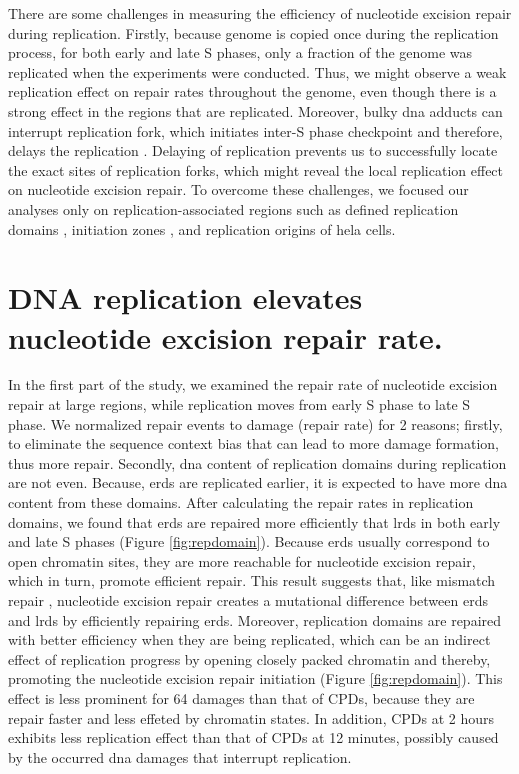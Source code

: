 There are some challenges in measuring the efficiency of nucleotide excision repair during replication. Firstly, because genome is copied once during the replication process, for both early and late S phases, only a fraction of the genome was replicated when the experiments were conducted. Thus, we might observe a weak replication effect on repair rates throughout the genome, even though there is a strong effect in the regions that are replicated. Moreover, bulky \gls{dna} adducts can interrupt replication fork, which initiates inter-S phase checkpoint and therefore, delays the replication \citep{minca2011replication}. Delaying of replication prevents us to successfully locate the exact sites of replication forks, which might reveal the local replication effect on nucleotide excision repair. To overcome these challenges, we focused our analyses only on replication-associated regions such as defined replication domains \citep{liu2016novo}, initiation zones \citep{petryk2016replication}, and replication origins \citep{besnard2012unraveling} of \gls{hela} cells.     

\section{DNA replication elevates nucleotide excision repair rate.}

In the first part of the study, we examined the repair rate of nucleotide excision repair at large regions, while replication moves from early S phase to late S phase. We normalized repair events to damage (repair rate) for 2 reasons; firstly, to eliminate the sequence context bias that can lead to more damage formation, thus more repair. Secondly, \gls{dna} content of replication domains during replication are not even. Because, \gls{erd}s are replicated earlier, it is expected to have more \gls{dna} content from these domains. After calculating the repair rates in replication domains, we found that \gls{erd}s are repaired more efficiently that \gls{lrd}s in both early and late S phases (Figure \ref{fig:repdomain}). Because \gls{erd}s usually correspond to open chromatin sites, they are more reachable for nucleotide excision repair, which in turn, promote efficient repair. This result suggests that, like mismatch repair \citep{supek2015differential}, nucleotide excision repair creates a mutational difference between \gls{erd}s and \gls{lrd}s by efficiently repairing \gls{erd}s. Moreover, replication domains are repaired with better efficiency when they are being replicated, which can be an indirect effect of replication progress by opening closely packed chromatin and thereby, promoting the nucleotide excision repair initiation (Figure \ref{fig:repdomain}). This effect is less prominent for \gls{64} damages than that of \gls{CPD}s, because they are repair faster and less effeted by chromatin states. In addition, \gls{CPD}s at 2 hours exhibits less replication effect than that of \gls{CPD}s at 12 minutes, possibly caused by the occurred \gls{dna} damages that interrupt replication. 


